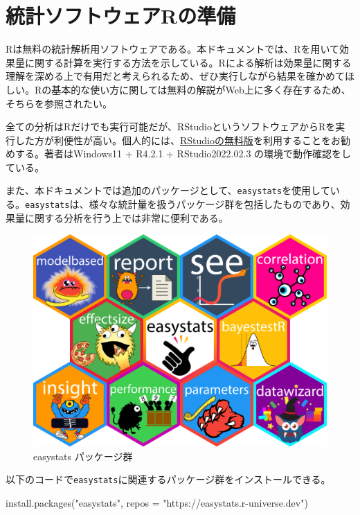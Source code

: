 \documentclass[
  ja=standard, xelatex, base=12pt]{bxjsreport}
\newenvironment{Shaded}{\begin{snugshade}}{\end{snugshade}}
\newcommand{\AttributeTok}[1]{\textcolor[rgb]{0.77,0.63,0.00}{#1}}
\newcommand{\FunctionTok}[1]{\textcolor[rgb]{0.00,0.00,0.00}{#1}}
\newcommand{\NormalTok}[1]{#1}
\newcommand{\StringTok}[1]{\textcolor[rgb]{0.31,0.60,0.02}{#1}}
\begin{document}
\hypertarget{ux7d71ux8a08ux30bdux30d5ux30c8ux30a6ux30a7ux30a2rux306eux6e96ux5099}{%
\section{統計ソフトウェアRの準備}\label{ux7d71ux8a08ux30bdux30d5ux30c8ux30a6ux30a7ux30a2rux306eux6e96ux5099}}

Rは無料の統計解析用ソフトウェアである。本ドキュメントでは、Rを用いて効果量に関する計算を実行する方法を示している。Rによる解析は効果量に関する理解を深める上で有用だと考えられるため、ぜひ実行しながら結果を確かめてほしい。Rの基本的な使い方に関しては無料の解説がWeb上に多く存在するため、そちらを参照されたい。

全ての分析はRだけでも実行可能だが、RStudioというソフトウェアからRを実行した方が利便性が高い。個人的には、\href{https://www.rstudio.com/products/rstudio/download/}{RStudioの無料版}を利用することをお勧めする。著者はWindows11 + R4.2.1 + RStudio2022.02.3 の環境で動作確認をしている。

また、本ドキュメントでは追加のパッケージとして、\texttt{easystats}を使用している。\texttt{easystats}は、様々な統計量を扱うパッケージ群を包括したものであり、効果量に関する分析を行う上では非常に便利である。

\begin{figure}
\centering
\includegraphics{images/logo_wall.png}
\caption{easystats パッケージ群}
\end{figure}

以下のコードで\texttt{easystats}に関連するパッケージ群をインストールできる。

\begin{Shaded}
\begin{Highlighting}[]
\FunctionTok{install.packages}\NormalTok{(}\StringTok{"easystats"}\NormalTok{, }\AttributeTok{repos =} \StringTok{"https://easystats.r{-}universe.dev"}\NormalTok{)}
\end{Highlighting}
\end{Shaded}
\end{document}
